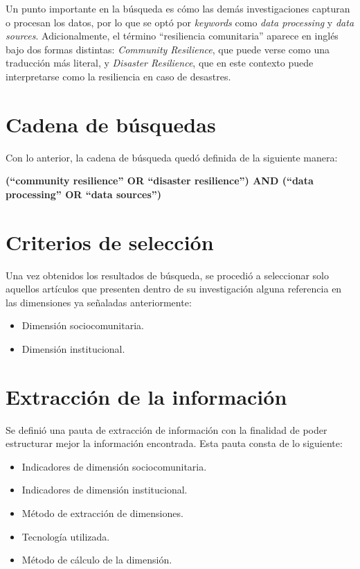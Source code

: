 \documentclass[12pt,letterpaper,oneside]{report}
\begin{document}
Un punto importante en la b\'usqueda es c\'omo las dem\'as investigaciones capturan o procesan los datos, por lo que se opt\'o por \textit{keywords} como \textit{data processing} y \textit{data sources}. Adicionalmente, el t\'ermino ``resiliencia comunitaria'' aparece en ingl\'es bajo dos formas distintas: \textit{Community Resilience}, que puede verse como una traducci\'on m\'as literal, y \textit{Disaster Resilience}, que en este contexto puede interpretarse como la resiliencia en caso de desastres.

\section{Cadena de b\'usquedas}
\label{sec:cadena-busqueda}

Con lo anterior, la cadena de b\'usqueda qued\'o definida de la siguiente manera:

\textbf{(``community resilience'' OR ``disaster resilience'') AND (``data processing'' OR ``data sources'')}

\section{Criterios de selecci\'on}
\label{sec:criterios-seleccion}

Una vez obtenidos los resultados de b\'usqueda, se procedi\'o a seleccionar solo aquellos art\'iculos que presenten dentro de su investigaci\'on alguna referencia en las dimensiones ya se\~naladas anteriormente:

\begin{itemize}
  \item Dimensi\'on sociocomunitaria.
  \item Dimensi\'on institucional.
\end{itemize}

\section{Extracci\'on de la informaci\'on}
\label{sec:extraccion-info}

Se defini\'o una pauta de extracci\'on de informaci\'on con la finalidad de poder estructurar mejor la informaci\'on encontrada. Esta pauta consta de lo siguiente:

\begin{itemize}
  \item Indicadores de dimensi\'on sociocomunitaria.
  \item Indicadores de dimensi\'on institucional.
  \item M\'etodo de extracci\'on de dimensiones.
  \item Tecnolog\'ia utilizada.
  \item M\'etodo de c\'alculo de la dimensi\'on.
\end{itemize}
\end{document}
